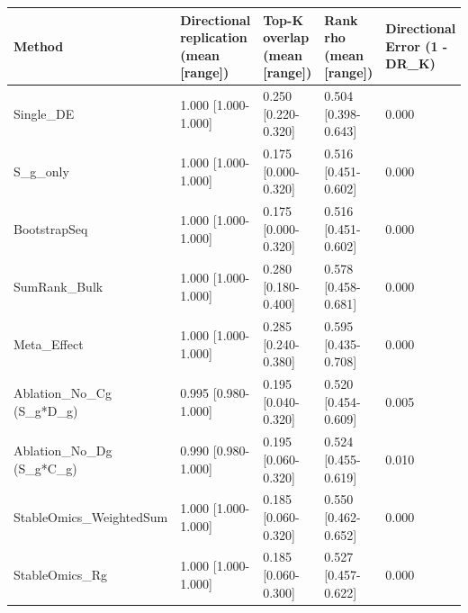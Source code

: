 \begin{tabular}{lllll}
\toprule
Method & Directional replication (mean [range]) & Top-K overlap (mean [range]) & Rank rho (mean [range]) & Directional Error (1 - DR_K) \\
\midrule
Single_DE & 1.000 [1.000-1.000] & 0.250 [0.220-0.320] & 0.504 [0.398-0.643] & 0.000 \\
S_g_only & 1.000 [1.000-1.000] & 0.175 [0.000-0.320] & 0.516 [0.451-0.602] & 0.000 \\
BootstrapSeq & 1.000 [1.000-1.000] & 0.175 [0.000-0.320] & 0.516 [0.451-0.602] & 0.000 \\
SumRank_Bulk & 1.000 [1.000-1.000] & 0.280 [0.180-0.400] & 0.578 [0.458-0.681] & 0.000 \\
Meta_Effect & 1.000 [1.000-1.000] & 0.285 [0.240-0.380] & 0.595 [0.435-0.708] & 0.000 \\
Ablation_No_Cg (S_g*D_g) & 0.995 [0.980-1.000] & 0.195 [0.040-0.320] & 0.520 [0.454-0.609] & 0.005 \\
Ablation_No_Dg (S_g*C_g) & 0.990 [0.980-1.000] & 0.195 [0.060-0.320] & 0.524 [0.455-0.619] & 0.010 \\
StableOmics_WeightedSum & 1.000 [1.000-1.000] & 0.185 [0.060-0.320] & 0.550 [0.462-0.652] & 0.000 \\
StableOmics_Rg & 1.000 [1.000-1.000] & 0.185 [0.060-0.300] & 0.527 [0.457-0.622] & 0.000 \\
\bottomrule
\end{tabular}

